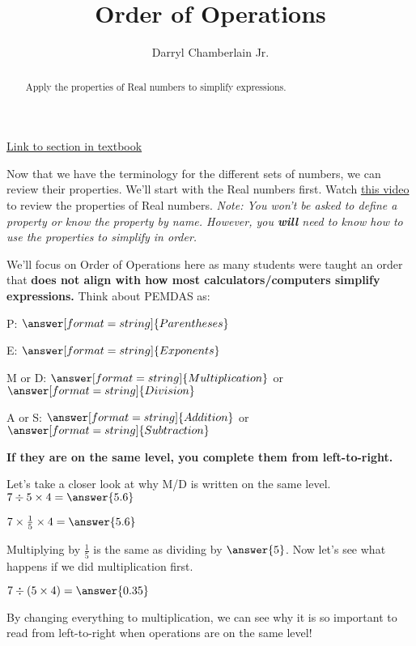 \documentclass{ximera}
\author{Darryl Chamberlain Jr.}
\title{Order of Operations}
\begin{document}
\begin{abstract}
Apply the properties of Real numbers to simplify expressions.
\end{abstract}
\maketitle

\href{https://cnx.org/contents/mwjClAV_@8.1:0KhpF2RH@23/Real-Numbers-Algebra-Essentials}{Link to section in textbook}


Now that we have the terminology for the different sets of numbers, we can review their properties. We'll start with the Real numbers first. Watch \href{https://mediasite.video.ufl.edu/Mediasite/Play/adc9e0878901450db891a5b46b383bf01d}{this video} to review the properties of Real numbers. \textit{Note: You won't be asked to define a property or know the property by name. However, you \textbf{will} need to know how to use the properties to simplify in order.}

We'll focus on Order of Operations here as many students were taught an order that \textbf{does not align with how most calculators/computers simplify expressions.} Think about PEMDAS as:

\begin{question}
P: $\answer[format=string]{Parentheses}$

E: $\answer[format=string]{Exponents}$

M or D: $\answer[format=string]{Multiplication}$ or $\answer[format=string]{Division}$

A or S: $\answer[format=string]{Addition}$ or $\answer[format=string]{Subtraction}$
\end{question}

{\Large \textbf{If they are on the same level, you complete them from left-to-right.}}

\begin{question}
Let's take a closer look at why M/D is written on the same level.
$7 \div 5 \times 4 = \answer{5.6}$

$7 \times \frac{1}{5} \times 4 = \answer{5.6}$

Multiplying by $\frac{1}{5}$ is the same as dividing by $\answer{5}$. Now let's see what happens if we did multiplication first.

$7 \div (5 \times 4) = \answer{0.35}$

By changing everything to multiplication, we can see why it is so important to read from left-to-right when operations are on the same level!
\end{question}
\end{document}
